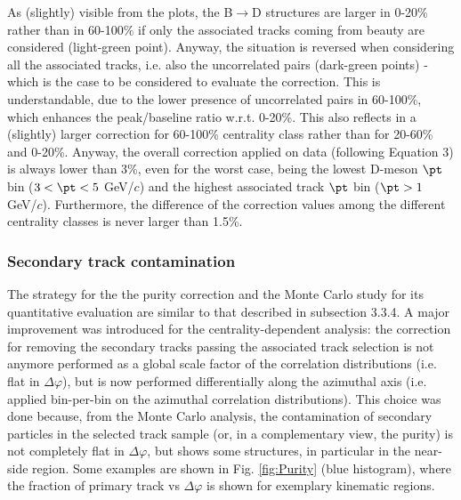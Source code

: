 As (slightly) visible from the plots, the B$\rightarrow$D structures are larger in 0-20\% rather than in 60-100\% if only the associated tracks coming from beauty are considered (light-green point). Anyway, the situation is reversed when considering all the associated tracks, i.e. also the uncorrelated pairs (dark-green points) - which is the case to be considered to evaluate the correction. This is understandable, due to the lower presence of uncorrelated pairs in 60-100\%, which enhances the peak/baseline ratio w.r.t. 0-20\%. This also reflects in a (slightly) larger correction for 60-100\% centrality class rather than for 20-60\% and 0-20\%.
Anyway, the overall correction applied on data (following Equation 3) is always lower than 3\%, even for the worst case, being the lowest D-meson $\pt$ bin ($3 < \pt < 5$ GeV/$c$) and the highest associated track $\pt$ bin ($\pt > 1$ GeV/$c$).
Furthermore, the difference of the correction values among the different centrality classes is never larger than 1.5\%.

\subsubsection{Secondary track contamination}
The strategy for the the purity correction and the Monte Carlo study for its quantitative evaluation are similar to that described in subsection 3.3.4.
A major improvement was introduced for the centrality-dependent analysis: the correction for removing the secondary tracks passing the associated track selection is not anymore performed as a global scale factor of the correlation distributions (i.e. flat in $\Delta\varphi$), but is now performed differentially along the azimuthal axis (i.e. applied bin-per-bin on the azimuthal correlation distributions).
This choice was done because, from the Monte Carlo analysis, the contamination of secondary particles in the selected track sample (or, in a complementary view, the purity) is not completely flat in $\Delta\varphi$, but shows some structures, in particular in the near-side region. Some examples are shown in Fig. \ref{fig:Purity} (blue histogram), where the fraction of primary track vs $\Delta\varphi$ is shown for exemplary kinematic regions.

